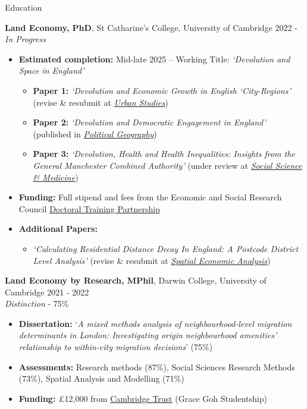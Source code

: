 \documentclass{resume} %
\begin{document}
\begin{rSection}{Education}

{\bf Land Economy, PhD}, St Catharine's College, University of Cambridge \hfill {2022 - }\\
\textit{In Progress} \\
\vspace{-1.5em}
 \begin{itemize}
     \itemsep -3pt {} 
    \item \textbf{Estimated completion:} Mid-late 2025 -- Working Title: \textit{`Devolution and Space in England'}
    \begin{itemize}
        \item \textbf{Paper 1:} \textit{`Devolution and Economic Growth in English `City-Regions' }(revise \& resubmit at \href{https://journals.sagepub.com/home/usj}{\textit{Urban Studies}})
        \item \textbf{Paper 2:} \textit{`Devolution and Democratic Engagement in England'} (published in \href{https://www.sciencedirect.com/journal/political-geography}{\textit{Political Geography}})
        \item \textbf{Paper 3:}  \textit{`Devolution, Health and Health Inequalities: Insights from the General Manchester Combined Authority'} (under review at  \href{https://www.sciencedirect.com/journal/social-science-and-medicine}{\textit{Social Science \& Medicine}})
     \end{itemize}
     \item \textbf{Funding:} Full stipend and fees from the Economic and Social Research Council \href{https://www.esrcdtp.group.cam.ac.uk}{Doctoral Training Partnership}
     \item \textbf{Additional Papers:} 
     \begin{itemize}
         \item \textit{`Calculating Residential Distance Decay In England: A Postcode District Level Analysis'} (revise \& resubmit at \href{https://www.tandfonline.com/journals/rsea20}{\textit{Spatial Economic Analysis}})
     \end{itemize}
 \end{itemize}

{\bf Land Economy by Research, MPhil}, Darwin College, University of Cambridge \hfill {2021 - 2022}\\
\textit{Distinction} - 75\%\\
\vspace{-1.5em}
 \begin{itemize}
    \itemsep -3pt {} 
    \item \textbf{Dissertation:} `\textit{A mixed methods analysis of neighbourhood-level migration determinants in London: Investigating origin neighbourhood amenities’ relationship to within-city migration decisions}' (75\%)
    \item \textbf{Assessments:} Research methods (87\%), Social Sciences Research Methods (73\%), Spatial Analysis and Modelling (71\%)
    \item \textbf{Funding:} £12,000 from \href{https://www.cambridgetrust.org/scholarships/}{Cambridge Trust} (Grace Goh Studentship)
 \end{itemize}


\end{rSection}
\end{document}
